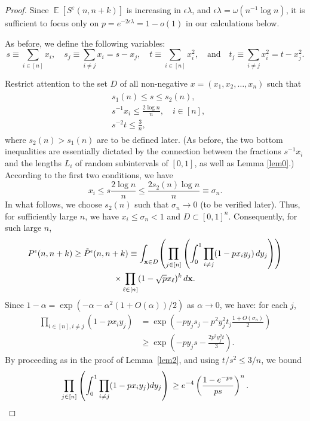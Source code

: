 \documentclass[11pt]{amsart}
\newcommand{\E}{\operatorname{\mathbb{E}}}
\def\eps{\varepsilon}
\theoremstyle{remark}
\numberwithin{equation}{section}
\begin{document}
\begin{proof}
Since $\E[S^{\eps}(n,n+k)]$ is increasing in $\epsilon\lambda$, and $\epsilon\lambda=\omega(n^{-1}\log n)$, it is sufficient to focus only on $p=e^{-2\epsilon\lambda}=1-o(1)$ in our calculations below.

As before, we define the following variables:
\begin{equation*}
    s \equiv \sum_{i \in [n]}x_i,\quad s_j \equiv \sum_{i\neq j}x_i=s-x_j, \quad t \equiv \sum_{i \in [n]}x_i^2 , \quad \text{and} \quad t_j\equiv \sum_{i\neq j}x_i^2=t-x_j^2.
\end{equation*}

Restrict attention to the set $D$ of all non-negative $x=(x_1,x_2,\ldots,x_n)$ such that
\begin{align}
\label{set_D_imbalance}
\begin{split}
&s_1(n)  \leq s \leq s_2(n), \\
&s^{-1} x_i \leq \frac{2\log n}{n},\quad i \in [n],\\
&s^{-2} t \leq \frac{3}{n},
\end{split}
\end{align}
where $s_2(n)>s_1(n)$ are to be defined later. (As before, the two bottom inequalities are essentially dictated by the connection between the fractions $s^{-1}x_i$ and the lengths $L_i$ of random subintervals 
of $[0,1]$, as well as Lemma \ref{lem0}.) According to the first two conditions, we have
\begin{equation*}
    x_i \leq s\frac{2\log n}{n} \leq \frac{2s_2(n)\log n}{n} \equiv \sigma_n.
\end{equation*}
In what follows, we choose $s_2(n)$ such that $\sigma_n \to 0$ (to be verified later). Thus, for sufficiently large $n$, we have $x_i\leq\sigma_n<1$ and $D \subset [0,1]^n$. Consequently, for such large $n$,
\begin{multline*}
P^\epsilon(n,n+k)\geq \tilde{P}^\epsilon(n,n+k) \equiv  \int_{\bold x \in D}\!\left(\prod_{j \in [n]}\left(\int_0^1 \prod_{i \neq j} (1-px_iy_j)\,dy_j\right)\right)\\
\times\prod_{\ell\in [n]}(1-\sqrt{p}x_{\ell})^k\,d\bold x.
\end{multline*}
Since $1-\alpha=\exp(-\alpha-\alpha^2(1+O(\alpha))/2)$ as $\alpha \to 0$, we have: for each $j$,
\begin{align*}
    \prod_{i \in[n], i\neq j} \left(1-px_iy_j\right) 
    &= \exp\left(-py_js_j-p^2y^2_jt_j\frac{1+O\left(\sigma_n\right)}{2}\right)\\
    &\geq \exp\left(-py_js-\frac{2p^2y^2_jt}{3}\right).
\end{align*}
By proceeding as in the proof of Lemma~\ref{lem2}, and using $t/s^2\leq3/n$, we bound
\begin{equation*}
\prod_{j \in [n]} \left( \int_0^1 \prod_{i \neq j} (1 - p x_i y_j) dy_j \right) \\
\geq e^{-4} \left(\frac{1 - e^{-ps}}{ps} \right)^n. 
\end{equation*}


\end{proof}
\end{document}
